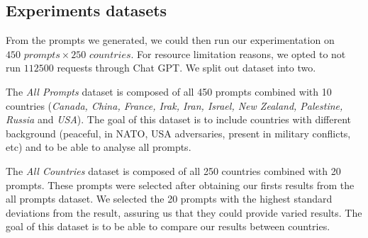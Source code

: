 \subsection{Experiments datasets}

From the prompts we generated, we could then run our experimentation on $450\textit{ prompts}\times 250\textit{ countries}$. For resource limitation reasons, we opted to not run $112 500$ requests through Chat GPT. We split out dataset into two.

The \textit{All Prompts}\label{dataset:all-prompts} dataset is composed of all 450 prompts combined with 10 countries (\textit{Canada, China, France, Irak, Iran, Israel, New Zealand, Palestine, Russia} and \textit{USA}). The goal of this dataset is to include countries with different background (peaceful, in NATO, USA adversaries, present in military conflicts, etc) and to be able to analyse all prompts.

The \textit{All Countries}\label{dataset:all-countries} dataset is composed of all 250 countries combined with 20 prompts. These prompts were selected after obtaining our firsts results from the all prompts dataset. We selected the 20 prompts with the highest standard deviations from the result, assuring us that they could provide varied results. The goal of this dataset is to be able to compare our results between countries.